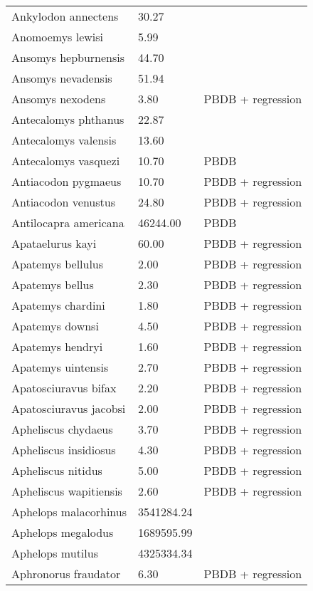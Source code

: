 \begin{longtable}{p{} p{} p{}}
    Ankylodon annectens & 30.27 & \cite{Tomiya2013} \\ 
    Anomoemys lewisi & 5.99 & \cite{Simons1960} \\ 
    Ansomys hepburnensis & 44.70 & \cite{Tomiya2013} \\ 
    Ansomys nevadensis & 51.94 & \cite{Tomiya2013} \\ 
    Ansomys nexodens & 3.80 & PBDB + regression \\ 
    Antecalomys phthanus & 22.87 & \cite{Tomiya2013} \\ 
    Antecalomys valensis & 13.60 & \cite{Tomiya2013} \\ 
    Antecalomys vasquezi & 10.70 & PBDB \\ 
    Antiacodon pygmaeus & 10.70 & PBDB + regression \\ 
    Antiacodon venustus & 24.80 & PBDB + regression \\ 
    Antilocapra americana & 46244.00 & PBDB \\ 
    Apataelurus kayi & 60.00 & PBDB + regression \\ 
    Apatemys bellulus & 2.00 & PBDB + regression \\ 
    Apatemys bellus & 2.30 & PBDB + regression \\ 
    Apatemys chardini & 1.80 & PBDB + regression \\ 
    Apatemys downsi & 4.50 & PBDB + regression \\ 
    Apatemys hendryi & 1.60 & PBDB + regression \\ 
    Apatemys uintensis & 2.70 & PBDB + regression \\ 
    Apatosciuravus bifax & 2.20 & PBDB + regression \\ 
    Apatosciuravus jacobsi & 2.00 & PBDB + regression \\ 
    Apheliscus chydaeus & 3.70 & PBDB + regression \\ 
    Apheliscus insidiosus & 4.30 & PBDB + regression \\ 
    Apheliscus nitidus & 5.00 & PBDB + regression \\ 
    Apheliscus wapitiensis & 2.60 & PBDB + regression \\ 
    Aphelops malacorhinus & 3541284.24 & \cite{Tomiya2013} \\ 
    Aphelops megalodus & 1689595.99 & \cite{Tomiya2013} \\ 
    Aphelops mutilus & 4325334.34 & \cite{Tomiya2013} \\ 
    Aphronorus fraudator & 6.30 & PBDB + regression \\ 

\end{longtable}
